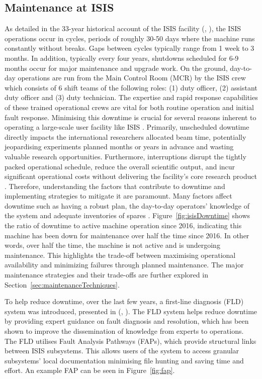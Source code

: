 \documentclass[10pt,oneside]{report}
\renewcommand{\citet}[1]{\citeauthor{#1}, \citeyear{#1}}
\begin{document}
\subsection{Maintenance at ISIS} 
As detailed in the 33-year historical account of the ISIS facility (\citet{thomason2019isis}), the ISIS operations occur in cycles, periods of roughly 30-50 days where the machine runs constantly without breaks. Gaps between cycles typically range from 1 week to 3 months. In addition, typically every four years, shutdowns scheduled for 6-9 months occur for major maintenance and upgrade work. On the ground, day-to-day operations are run from the Main Control Room (MCR) by the ISIS crew which consists of 6 shift teams of the following roles: (1) duty officer, (2) assistant duty officer and (3) duty technician. The expertise and rapid response capabilities of these trained operational crews are vital for both routine operation and initial fault response.
Minimising this downtime is crucial for several reasons inherent to operating a large-scale user facility like ISIS \cite{thomason2019isis}. Primarily, unscheduled downtime directly impacts the international researchers allocated beam time, potentially jeopardising experiments planned months or years in advance and wasting valuable research opportunities. Furthermore, interruptions disrupt the tightly packed operational schedule, reduce the overall scientific output, and incur significant operational costs without delivering the facility's core research product \cite{thomason2019isis}. Therefore, understanding the factors that contribute to downtime and implementing strategies to mitigate it are paramount.
Many factors affect downtime such as having a robust plan, the day-to-day operators' knowledge of the system and adequate inventories of spares \cite{thomason2019isis}. Figure~\ref{fig:isisDowntime} shows the ratio of downtime to active machine operation since 2016, indicating this machine has been down for maintenance over half the time since 2016. In other words, over half the time, the machine is not active and is undergoing maintenance. This highlights the trade-off between maximising operational availability and minimizing failures through planned maintenance. The major maintenance strategies and their trade-offs are further explored in Section~\ref{sec:maintenanceTechniques}.

To help reduce downtime, over the last few years, a first-line diagnosis (FLD) system was introduced, presented in (\citet{fld2017}). The FLD system helps reduce downtime by providing expert guidance on fault diagnosis and resolution, which has been shown to improve the dissemination of knowledge from experts to operations. The FLD utilises Fault Analysis Pathways (FAPs), which provide structural links between ISIS subsystems. This allows users of the system to access granular subsystems' local documentation minimising file hunting and saving time and effort. An example FAP can be seen in Figure~\ref{fig:fap}.
\end{document}
